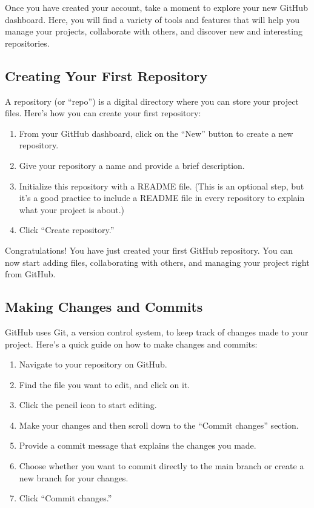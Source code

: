 \documentclass[a4paper,12pt]{book}
\begin{document}
Once you have created your account, take a moment to explore your new GitHub dashboard. Here, you will find a variety of tools and features that will help you manage your projects, collaborate with others, and discover new and interesting repositories.

\subsection*{Creating Your First Repository}

A repository (or “repo”) is a digital directory where you can store your project files. Here’s how you can create your first repository:

\begin{enumerate}
    \item From your GitHub dashboard, click on the “New” button to create a new repository.
    \item Give your repository a name and provide a brief description.
    \item Initialize this repository with a README file. (This is an optional step, but it’s a good practice to include a README file in every repository to explain what your project is about.)
    \item Click “Create repository.”
\end{enumerate}

Congratulations! You have just created your first GitHub repository. You can now start adding files, collaborating with others, and managing your project right from GitHub.

\subsection*{Making Changes and Commits}

GitHub uses Git, a version control system, to keep track of changes made to your project. Here’s a quick guide on how to make changes and commits:

\begin{enumerate}
    \item Navigate to your repository on GitHub.
    \item Find the file you want to edit, and click on it.
    \item Click the pencil icon to start editing.
    \item Make your changes and then scroll down to the “Commit changes” section.
    \item Provide a commit message that explains the changes you made.
    \item Choose whether you want to commit directly to the main branch or create a new branch for your changes.
    \item Click “Commit changes.”
\end{enumerate}
\end{document}
